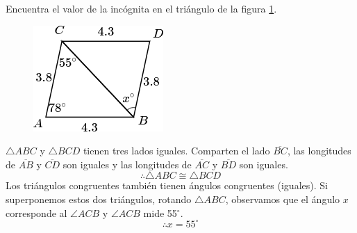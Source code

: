 Encuentra el valor de la incógnita en el triángulo de la figura \ref{fig:angle_triangle_05}.

\begin{minipage}[t][5cm][b]{0.3\textwidth}
    \begin{figure}[H]
        \centering
        \includegraphics[width=0.99\linewidth]{../images/angle_triangle_05.png}
        \caption{}
        \label{fig:angle_triangle_05}
    \end{figure}
\end{minipage}\hfill
\begin{minipage}[t]{0.65\textwidth}
    \begin{solutionbox}{5cm}
        $\triangle ABC$ y $\triangle BCD$ tienen tres lados iguales. Comparten el lado
        $\overline{BC}$, las longitudes de $\overline{AB}$ y $\overline{CD}$ son iguales y las longitudes de
        $\overline{AC}$ y $\overline{BD}$ son iguales.
        \[\therefore \triangle ABC \cong \triangle BCD\]
        Los triángulos congruentes también tienen ángulos congruentes (iguales). Si superponemos estos dos triángulos, rotando
        $\triangle ABC$, observamos que el ángulo $x$ corresponde al
        $\angle ACB$ y $\angle ACB$ mide
        55$^\circ$.
        \[\therefore x=55^\circ\]
    \end{solutionbox}
\end{minipage}

